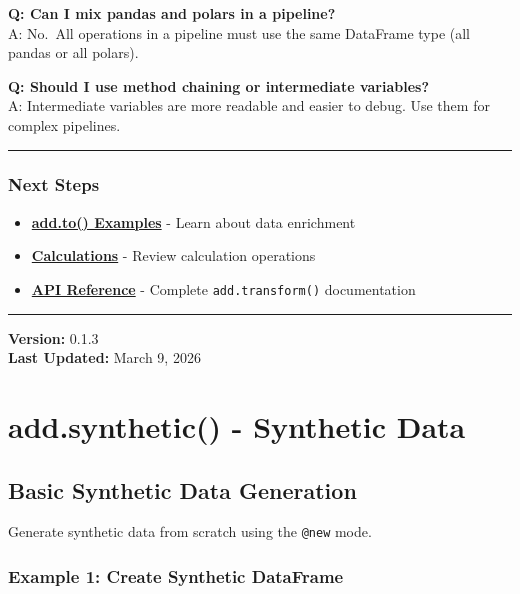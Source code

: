 \documentclass[
  letterpaper,
]{scrbook}
\providecommand{\tightlist}{%
  \setlength{\itemsep}{0pt}\setlength{\parskip}{0pt}}
\begin{document}
\textbf{Q: Can I mix pandas and polars in a pipeline?}\\
A: No.~All operations in a pipeline must use the same DataFrame type
(all pandas or all polars).

\textbf{Q: Should I use method chaining or intermediate variables?}\\
A: Intermediate variables are more readable and easier to debug. Use
them for complex pipelines.

\begin{center}\rule{0.5\linewidth}{0.5pt}\end{center}

\section{Next Steps}\label{next-steps-11}

\begin{itemize}
\tightlist
\item
  \textbf{\href{examples-to-01-basic.html}{add.to() Examples}} - Learn
  about data enrichment
\item
  \textbf{\href{examples-transform-01-calc.html}{Calculations}} - Review
  calculation operations
\item
  \textbf{\href{reference-transform.html}{API Reference}} - Complete
  \texttt{add.transform()} documentation
\end{itemize}

\begin{center}\rule{0.5\linewidth}{0.5pt}\end{center}

\textbf{Version:} 0.1.3\\
\textbf{Last Updated:} March 9, 2026

\part{add.synthetic() - Synthetic Data}

\chapter{Basic Synthetic Data
Generation}\label{basic-synthetic-data-generation}

Generate synthetic data from scratch using the \texttt{@new} mode.

\section{Example 1: Create Synthetic
DataFrame}\label{example-1-create-synthetic-dataframe}
\end{document}
